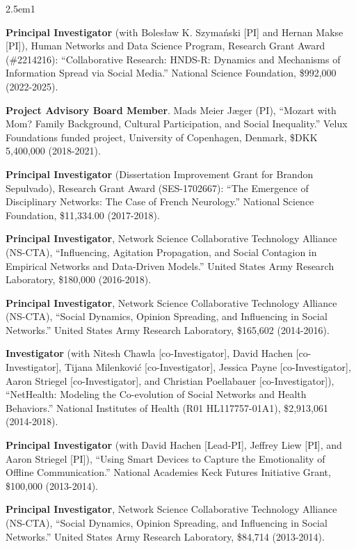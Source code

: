 \documentclass[
]{article}
\newenvironment{cventry}{\begin{hangparas}{2.5em}{1}}{\end{hangparas}}
\begin{document}
\begin{cventry}

\textbf{Principal Investigator} (with Bolesław K. Szymański {[}PI{]} and
Hernan Makse {[}PI{]}), Human Networks and Data Science Program,
Research Grant Award (\#2214216): ``Collaborative Research: HNDS-R:
Dynamics and Mechanisms of Information Spread via Social Media.''
National Science Foundation, \$992,000 (2022-2025).

\textbf{Project Advisory Board Member}. Mads Meier Jæger (PI), ``Mozart
with Mom? Family Background, Cultural Participation, and Social
Inequality.'' Velux Foundations funded project, University of
Copenhagen, Denmark, \$DKK 5,400,000 (2018-2021).

\textbf{Principal Investigator} (Dissertation Improvement Grant for
Brandon Sepulvado), Research Grant Award (SES-1702667): ``The Emergence
of Disciplinary Networks: The Case of French Neurology.'' National
Science Foundation, \$11,334.00 (2017-2018).

\textbf{Principal Investigator}, Network Science Collaborative
Technology Alliance (NS-CTA), ``Influencing, Agitation Propagation, and
Social Contagion in Empirical Networks and Data-Driven Models.'' United
States Army Research Laboratory, \$180,000 (2016-2018).

\textbf{Principal Investigator}, Network Science Collaborative
Technology Alliance (NS-CTA), ``Social Dynamics, Opinion Spreading, and
Influencing in Social Networks.'' United States Army Research
Laboratory, \$165,602 (2014-2016).

\textbf{Investigator} (with Nitesh Chawla {[}co-Investigator{]}, David
Hachen {[}co-Investigator{]}, Tijana Milenković {[}co-Investigator{]},
Jessica Payne {[}co-Investigator{]}, Aaron Striegel
{[}co-Investigator{]}, and Christian Poellabauer {[}co-Investigator{]}),
``NetHealth: Modeling the Co-evolution of Social Networks and Health
Behaviors.'' National Institutes of Health (R01 HL117757-01A1),
\$2,913,061 (2014-2018).

\textbf{Principal Investigator} (with David Hachen {[}Lead-PI{]},
Jeffrey Liew {[}PI{]}, and Aaron Striegel {[}PI{]}), ``Using Smart
Devices to Capture the Emotionality of Offline Communication.'' National
Academies Keck Futures Initiative Grant, \$100,000 (2013-2014).

\textbf{Principal Investigator}, Network Science Collaborative
Technology Alliance (NS-CTA), ``Social Dynamics, Opinion Spreading, and
Influencing in Social Networks.'' United States Army Research
Laboratory, \$84,714 (2013-2014).


\end{cventry}
\end{document}
